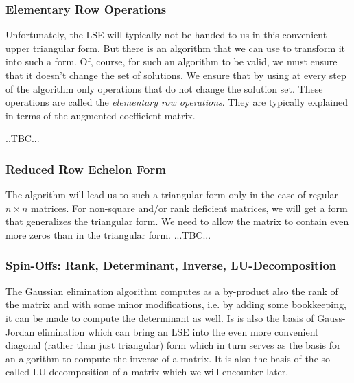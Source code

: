 \subsubsection{Elementary Row Operations}
Unfortunately, the LSE will typically not be handed to us in this convenient upper triangular form. But there is an algorithm that we can use to transform it into such a form. Of, course, for such an algorithm to be valid, we must ensure that it doesn't change the set of solutions. We ensure that by using at every step of the algorithm only operations that do not change the solution set. These operations are called the \emph{elementary row operations}. They are typically explained in terms of the augmented coefficient matrix.

..TBC...


\subsubsection{Reduced Row Echelon Form}
The algorithm will lead us to such a triangular form only in the case of regular $n \times n$ matrices. For non-square and/or rank deficient matrices, we will get a form that generalizes the triangular form. We need to allow the matrix to contain even more zeros than in the triangular form. ...TBC...


\subsubsection{Spin-Offs: Rank, Determinant, Inverse, LU-Decomposition}
The Gaussian elimination algorithm computes as a by-product also the rank of the matrix and with some minor modifications, i.e. by adding some bookkeeping, it can be made to compute the determinant as well. Is is also the basis of Gauss-Jordan elimination which can bring an LSE into the even more convenient diagonal (rather than just triangular) form which in turn serves as the basis for an algorithm to compute the inverse of a matrix. It is also the basis of the so called LU-decomposition of a matrix which we will encounter later.

